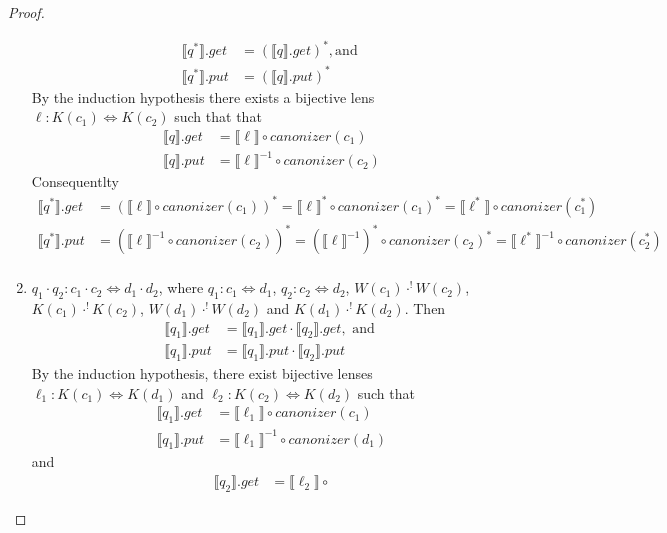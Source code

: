 \documentclass[acmsmall,review,anonymous]{acmart}
\newcommand{\kw}[1]{\ensuremath{\mathit{#1}}}
\newcommand{\canonizer}{\ensuremath{\kw{canonizer}}}
\newcommand{\get}{\ensuremath{\kw{get}}}
\newcommand{\lput}{\ensuremath{\kw{put}}}
\begin{document}
\begin{proof}
\begin{enumerate}
\begin{align*}
\llbracket q^* \rrbracket.\get &= (\llbracket q \rrbracket.\get)^*, \text{
and }\\
\llbracket q^* \rrbracket.\lput &= (\llbracket q \rrbracket.\lput)^*
\end{align*}
By the induction hypothesis there exists a bijective lens $\ell : K(c_1)
\Leftrightarrow K(c_2)$ such that
that
\begin{align*}
\llbracket q \rrbracket.\get &= \llbracket \ell \rrbracket \circ
\canonizer(c_1)\\
\llbracket q \rrbracket.\lput &= {\llbracket \ell \rrbracket}^{-1} \circ
\canonizer(c_2)
\end{align*}
Consequentlty
\begin{align*}
\llbracket q^* \rrbracket.\get &= (\llbracket \ell \rrbracket \circ
\canonizer(c_1))^* = \llbracket \ell \rrbracket^* \circ
\canonizer(c_1)^* = \llbracket \ell^* \rrbracket \circ
\canonizer(c_1^*)\\
\llbracket q^* \rrbracket.\lput &= (\llbracket \ell \rrbracket^{-1} \circ
\canonizer(c_2))^* = (\llbracket \ell \rrbracket^{-1})^* \circ
\canonizer(c_2)^* = \llbracket \ell^* \rrbracket^{-1} \circ
\canonizer(c_2^*)\\
\end{align*}
\item
$q_1 \cdot q_2: c_1 \cdot c_2 \Leftrightarrow d_1 \cdot d_2$, where $q_1 : c_1
\Leftrightarrow d_1 $,  $q_2 : c_2 \Leftrightarrow d_2$, $W(c_1)
\cdot^! W(c_2)$, $K(c_1) \cdot^! K(c_2)$, $W(d_1) \cdot^! W(d_2)$ and $
K(d_1) \cdot^! K(d_2)$. Then
\begin{align*}
\llbracket q_1 \rrbracket.\get &= \llbracket q_1 \rrbracket.\get \cdot \llbracket
q_2 \rrbracket.\get, \text{ and }\\
\llbracket q_1 \rrbracket.\lput &= \llbracket q_1 \rrbracket.\lput \cdot \llbracket
q_2 \rrbracket.\lput
\end{align*}
By the induction hypothesis, there exist bijective lenses $\ell_1 : K(c_1)
\Leftrightarrow K(d_1)$ and $\ell_2 : K(c_2) \Leftrightarrow K(d_2)$ such that
\begin{align*}
\llbracket q_1 \rrbracket.\get &= \llbracket \ell_1 \rrbracket \circ
\canonizer(c_1)\\
\llbracket q_1 \rrbracket.\lput &= {\llbracket \ell_1 \rrbracket}^{-1} \circ
\canonizer(d_1)
\end{align*}
and
\begin{align*}
\llbracket q_2 \rrbracket.\get &= \llbracket \ell_2 \rrbracket \circ

\end{align*}
\end{enumerate}
\end{proof}
\end{document}
